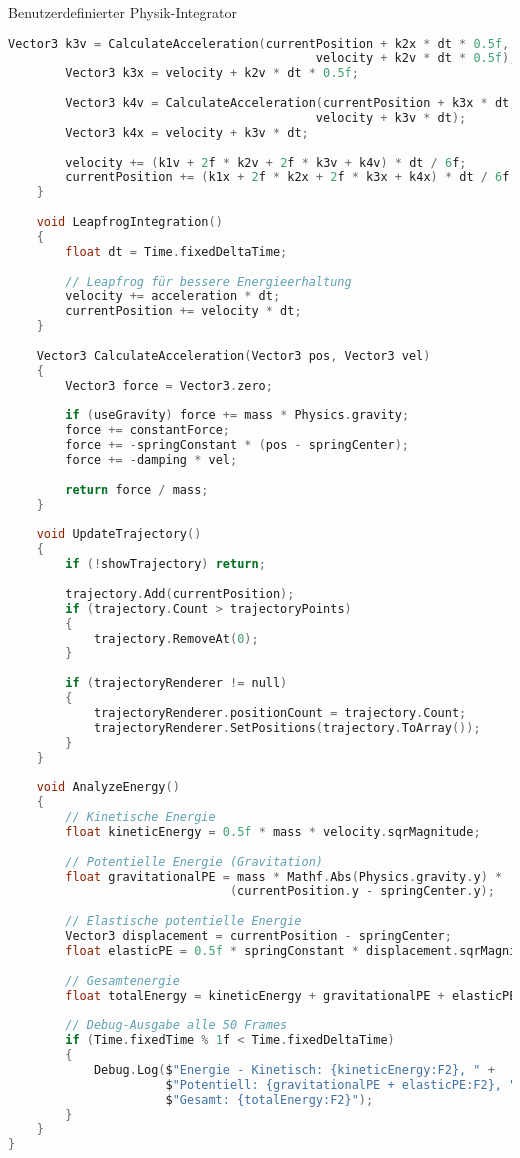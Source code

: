 \begin{code}{Benutzerdefinierter Physik-Integrator}
\begin{lstlisting}[language=C, style=basesmol]
        Vector3 k3v = CalculateAcceleration(currentPosition + k2x * dt * 0.5f, 
                                           velocity + k2v * dt * 0.5f);
        Vector3 k3x = velocity + k2v * dt * 0.5f;
        
        Vector3 k4v = CalculateAcceleration(currentPosition + k3x * dt, 
                                           velocity + k3v * dt);
        Vector3 k4x = velocity + k3v * dt;
        
        velocity += (k1v + 2f * k2v + 2f * k3v + k4v) * dt / 6f;
        currentPosition += (k1x + 2f * k2x + 2f * k3x + k4x) * dt / 6f;
    }
    
    void LeapfrogIntegration() 
    {
        float dt = Time.fixedDeltaTime;
        
        // Leapfrog für bessere Energieerhaltung
        velocity += acceleration * dt;
        currentPosition += velocity * dt;
    }
    
    Vector3 CalculateAcceleration(Vector3 pos, Vector3 vel) 
    {
        Vector3 force = Vector3.zero;
        
        if (useGravity) force += mass * Physics.gravity;
        force += constantForce;
        force += -springConstant * (pos - springCenter);
        force += -damping * vel;
        
        return force / mass;
    }
    
    void UpdateTrajectory() 
    {
        if (!showTrajectory) return;
        
        trajectory.Add(currentPosition);
        if (trajectory.Count > trajectoryPoints) 
        {
            trajectory.RemoveAt(0);
        }
        
        if (trajectoryRenderer != null) 
        {
            trajectoryRenderer.positionCount = trajectory.Count;
            trajectoryRenderer.SetPositions(trajectory.ToArray());
        }
    }
    
    void AnalyzeEnergy() 
    {
        // Kinetische Energie
        float kineticEnergy = 0.5f * mass * velocity.sqrMagnitude;
        
        // Potentielle Energie (Gravitation)
        float gravitationalPE = mass * Mathf.Abs(Physics.gravity.y) * 
                               (currentPosition.y - springCenter.y);
        
        // Elastische potentielle Energie
        Vector3 displacement = currentPosition - springCenter;
        float elasticPE = 0.5f * springConstant * displacement.sqrMagnitude;
        
        // Gesamtenergie
        float totalEnergy = kineticEnergy + gravitationalPE + elasticPE;
        
        // Debug-Ausgabe alle 50 Frames
        if (Time.fixedTime % 1f < Time.fixedDeltaTime) 
        {
            Debug.Log($"Energie - Kinetisch: {kineticEnergy:F2}, " +
                      $"Potentiell: {gravitationalPE + elasticPE:F2}, " +
                      $"Gesamt: {totalEnergy:F2}");
        }
    }
}
\end{lstlisting}
\end{code}

